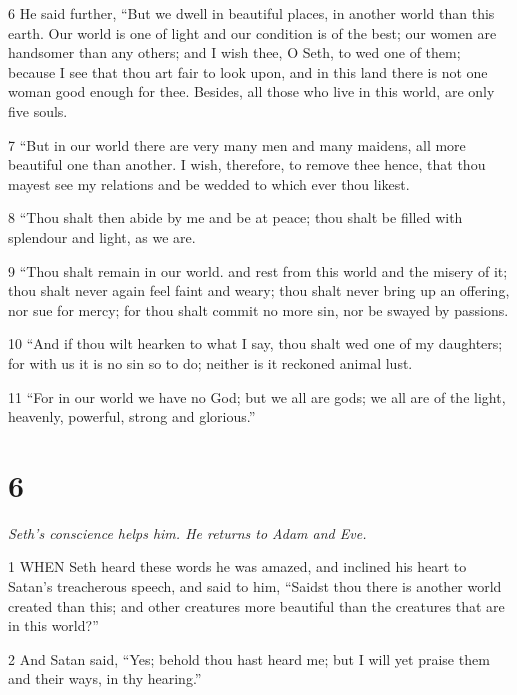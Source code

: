 \par 6 He said further, “But we dwell in beautiful places, in another world than this earth. Our world is one of light and our condition is of the best; our women are handsomer than any others; and I wish thee, O Seth, to wed one of them; because I see that thou art fair to look upon, and in this land there is not one woman good enough for thee. Besides, all those who live in this world, are only five souls.

\par 7 “But in our world there are very many men and many maidens, all more beautiful one than another. I wish, therefore, to remove thee hence, that thou mayest see my relations and be wedded to which ever thou likest.

\par 8 “Thou shalt then abide by me and be at peace; thou shalt be filled with splendour and light, as we are.

\par 9 “Thou shalt remain in our world. and rest from this world and the misery of it; thou shalt never again feel faint and weary; thou shalt never bring up an offering, nor sue for mercy; for thou shalt commit no more sin, nor be swayed by passions.

\par 10 “And if thou wilt hearken to what I say, thou shalt wed one of my daughters; for with us it is no sin so to do; neither is it reckoned animal lust.

\par 11 “For in our world we have no God; but we all are gods; we all are of the light, heavenly, powerful, strong and glorious.”

\chapter{6}

\par \textit{Seth's conscience helps him. He returns to Adam and Eve.}

\par 1 WHEN Seth heard these words he was amazed, and inclined his heart to Satan's treacherous speech, and said to him, “Saidst thou there is another world created than this; and other creatures more beautiful than the creatures that are in this world?”

\par 2 And Satan said, “Yes; behold thou hast heard me; but I will yet praise them and their ways, in thy hearing.”


